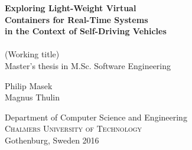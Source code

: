 
\begin{titlepage}
			
\addtolength{\voffset}{2cm}

 
\mbox{}
\vfill
\renewcommand{\familydefault}{\sfdefault} \normalfont %
\textbf{{\Huge 	Exploring Light-Weight Virtual \\[0.2cm] Containers for Real-Time Systems\\[0.2cm] 
				in the Context of Self-Driving Vehicles \\[0.2cm] 
				}} 	\\[1cm]
{\Large (Working title)}\\[0.5cm]
Master's thesis in M.Sc. Software Engineering \setlength{\parskip}{1cm}

{\Large Philip Masek} \setlength{\parskip}{2.9cm}\newline\\
{\Large Magnus Thulin} \setlength{\parskip}{2.9cm}

Department of Computer Science and Engineering \\
\textsc{Chalmers University of Technology} \\
Gothenburg, Sweden 2016

\renewcommand{\familydefault}{\rmdefault} \normalfont %
\end{titlepage}


\newpage
\restoregeometry
\thispagestyle{empty}
\mbox{}


